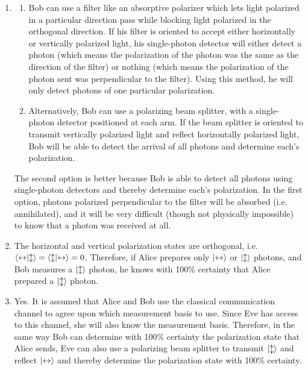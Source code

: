 \documentclass[12pt]{article}
\begin{document}
\begin{enumerate}[label=\textbf{\alph*.}]
    \item \begin{enumerate}[label=\textbf{\arabic*)}]
        \item Bob can use a filter like an absorptive polarizer which lets light polarized in a particular direction pass while blocking light polarized in the orthogonal direction. If his filter is oriented to accept either horizontally or vertically polarized light, his single-photon detector will either detect a photon (which means the polarization of the photon was the same as the direction of the filter) or nothing (which means the polarization of the photon sent was perpendicular to the filter). Using this method, he will only detect photons of one particular polarization.
        
        \item Alternatively, Bob can use a polarizing beam splitter, with a single-photon detector positioned at each arm. If the beam splitter is oriented to transmit vertically polarized light and reflect horizontally polarized light, Bob will be able to detect the arrival of all photons and determine each's polarization.
    \end{enumerate}
    
    The second option is better because Bob is able to detect all photons using single-photon detectors and thereby determine each's polarization. In the first option, photons polarized perpendicular to the filter will be absorbed (i.e. annihilated), and it will be very difficult (though not physically impossible) to know that a photon was received at all.
    
    \item The horizontal and vertical polarization states are orthogonal, i.e. $\braket{\leftrightarrow}{\updownarrow} = \braket{\updownarrow}{\leftrightarrow} = 0$. Therefore, if Alice prepares only $\ket{\leftrightarrow}$ or $\ket{\updownarrow}$ photons, and Bob measures a $\ket{\updownarrow}$ photon, he knows with 100\% certainty that Alice prepared a $\ket{\updownarrow}$ photon.
    
    \item Yes. It is assumed that Alice and Bob use the classical communication channel to agree upon which measurement basis to use. Since Eve has access to this channel, she will also know the measurement basis. Therefore, in the same way Bob can determine with 100\% certainty the polarization state that Alice sends, Eve can also use a polarizing beam splitter to transmit $\ket{\updownarrow}$ and reflect $\ket{\leftrightarrow}$ and thereby determine the polarization state with 100\% certainty.
    

\end{enumerate}
\end{document}
